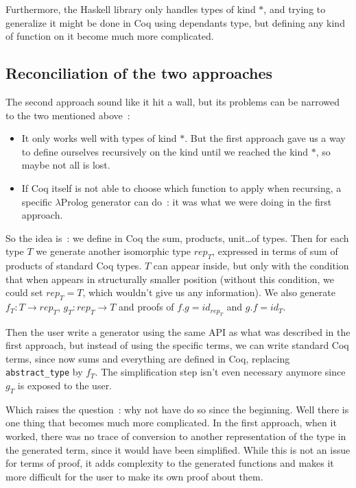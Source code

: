 \documentclass{article}
\newcommand{\lprog}{$\lambda$Prolog }
\begin{document}
Furthermore, the Haskell library only handles types of kind $*$, and trying
to generalize it might be done in Coq using dependants type, but defining any
kind of function on it become much more complicated.

\subsection{Reconciliation of the two approaches}

The second approach sound like it hit a wall, but its problems can be narrowed to
the two mentioned above~: \begin{itemize}
    \item It only works well with types of kind $*$. But the first approach gave
        us a way to define ourselves recursively on the kind until we reached
        the kind $*$, so maybe not all is lost.
    \item If Coq itself is not able to choose which function to apply when
        recursing, a specific \lprog generator can do~: it was what
        we were doing in the first approach.
\end{itemize}

So the idea is~: we define in Coq the sum, products, unit\ldots of types.
Then for each type $T$ we generate another isomorphic type $rep_T$, expressed
in terms of sum of products of standard Coq types. $T$ can appear inside,
but only with the condition that when appears in structurally smaller position
(without this condition, we could set $rep_T = T$, which wouldn't give us
any information). We also generate $f_T : T \rightarrow rep_T$, $g_T : rep_T\rightarrow T$
and proofs of $f . g = id_{rep_T}$ and $g . f = id_T$.

Then the user write a generator using the same API as what was described in the
first approach, but instead of using the specific terms, we can write standard
Coq terms, since now sums and everything are defined in Coq, replacing
\texttt{abstract\_type} by $f_T$. The simplification step isn't even necessary
anymore since $g_T$ is exposed to the user.

Which raises the question~: why not have do so since the beginning. Well there
is one thing that becomes much more complicated. In the first approach, when it
worked, there was no trace of conversion to another representation of the type
in the generated term, since it would have been simplified. While this is not
an issue for terms of proof, it adds complexity to the generated functions and
makes it more difficult for the user to make its own proof about them.
\end{document}

